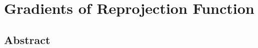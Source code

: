 \appendix

\chapter{Gradients of Reprojection Function}%
\label{cha:gradients_of_reprojection_function}



\backmatter%




\clearpage
\pagestyle{empty}


\clearpage
\section*{Abstract}

